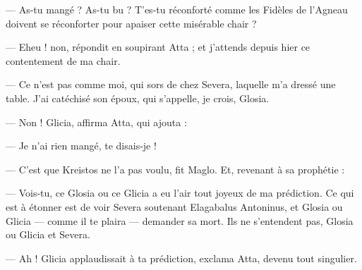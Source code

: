 \documentclass[a4paper, 11pt, oneside, polutonikogreek, french]{article}
\begin{document}
--- As-tu mangé ? As-tu bu ? T'es-tu réconforté comme les Fidèles de l'Agneau doivent se réconforter pour apaiser cette misérable chair ?

--- Eheu ! non, répondit en soupirant Atta ; et j'attends depuis hier ce contentement de ma chair.

--- Ce n'est pas comme moi, qui sors de chez Severa, laquelle m'a dressé une table. J'ai catéchisé son époux, qui s'appelle, je crois, Glosia.

--- Non ! Glicia, affirma Atta, qui ajouta :

--- Je n'ai rien mangé, te disais-je !

--- C'est que Kreistos ne l'a pas voulu, fit Maglo. Et, revenant à sa prophétie :

--- Vois-tu, ce Glosia ou ce Glicia a eu l'air tout joyeux de ma prédiction. Ce qui est à étonner est de voir Severa soutenant Elagabalus Antoninus, et Glosia ou Glicia --- comme il te plaira --- demander sa mort. Ils ne s'entendent pas, Glosia ou Glicia et Severa.

--- Ah ! Glicia applaudissait à ta prédiction, exclama Atta, devenu tout singulier.
\end{document}
